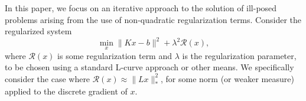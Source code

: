 In this paper, we focus on an iterative approach to the solution of
ill-posed problems arising from the use of non-quadratic
regularization terms.  Consider the regularized system
\[
\min_x \|Kx-b\|^2 + \lambda^2 \mathcal{R}(x),
\]
where $\mathcal{R}(x)$ is some regularization term and $\lambda$ is
the regularization parameter, to be chosen using a standard L-curve
approach \cite{OlearyHansen,etc} or other means.  We specifically
consider the case where $\mathcal{R}(x) \approx \|Lx\|_\ast^2$, for
some norm (or weaker measure) applied to the discrete gradient of $x$.
